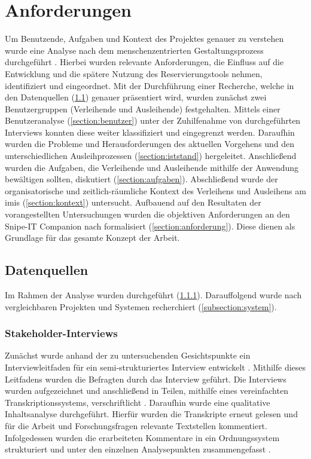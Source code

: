 \chapter{Anforderungen}
\label{chapter-analyse}

Um Benutzende, Aufgaben und Kontext des Projektes genauer zu verstehen wurde eine Analyse nach dem
menschenzentrierten Gestaltungsprozess durchgeführt \cite{din_en_iso_9421-2102020-03_din_nodate}.
Hierbei wurden relevante Anforderungen, die Einfluss auf die Entwicklung und die spätere Nutzung des
Reservierungstools nehmen, identifiziert und eingeordnet. Mit der Durchführung einer Recherche,
welche in den Datenquellen (\ref{section:daten}) genauer präsentiert wird, wurden zunächst zwei
Benutzergruppen (Verleihende und Ausleihende) festgehalten. Mittels einer Benutzeranalyse
(\ref{section:benutzer}) unter der Zuhilfenahme von durchgeführten Interviews konnten diese weiter
klassifiziert und eingegrenzt werden. Daraufhin wurden die Probleme und Herausforderungen des
aktuellen Vorgehens und den unterschiedlichen Ausleihprozessen (\ref{section:iststand}) hergeleitet.
Anschließend wurden die Aufgaben, die Verleihende und Ausleihende mithilfe der Anwendung bewältigen
sollten, diskutiert (\ref{section:aufgaben}). Abschließend wurde der organisatorische und
zeitlich-räumliche Kontext des Verleihens und Ausleihens am \ac{imis} (\ref{section:kontext})
untersucht. Aufbauend auf den Resultaten der vorangestellten Untersuchungen wurden die objektiven
Anforderungen an den Snipe-IT Companion nach  formalisiert
(\ref{section:anforderung}). Diese dienen als Grundlage für das gesamte Konzept der Arbeit.

\section{Datenquellen}
\label{section:daten}
Im Rahmen der Analyse wurden  durchgeführt (\ref{subsection:interview}).
Darauffolgend wurde nach vergleichbaren Projekten und Systemen recherchiert
(\ref{subsection:system}).

\subsection{Stakeholder-Interviews}
\label{subsection:interview}
Zunächst wurde anhand der zu untersuchenden Gesichtspunkte ein Interviewleitfaden für ein
semi-strukturiertes Interview entwickelt . Mithilfe dieses Leitfadens wurden die Befragten
durch das Interview geführt. Die Interviews wurden aufgezeichnet und anschließend in Teilen,
mithilfe eines vereinfachten Transkriptionssystems, verschriftlicht \cite{dresing_praxisbuch_2016}. Daraufhin wurde eine
qualitative Inhaltsanalyse durchgeführt. Hierfür wurden die Transkripte erneut gelesen und für die
Arbeit und Forschungsfragen relevante Textstellen kommentiert. Infolgedessen wurden die erarbeiteten
Kommentare in ein Ordnungssystem strukturiert und unter den einzelnen Analysepunkten zusammengefasst
\cite{dresing_praxisbuch_2016}.

